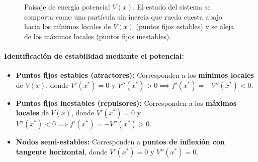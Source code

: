 \begin{figure}[htbp]
\centering
{}
\caption{Paisaje de energía potencial $V(x)$. El estado del sistema se comporta como una partícula sin inercia que rueda cuesta abajo hacia los mínimos locales de $V(x)$ (puntos fijos estables) y se aleja de los máximos locales (puntos fijos inestables).}
\label{fig:paisaje_potencial}
\end{figure}

\paragraph{Identificación de estabilidad mediante el potencial:}
\begin{itemize}
    \item \textbf{Puntos fijos estables (atractores):} Corresponden a los \textbf{mínimos locales} de $V(x)$, donde $V'(x^*) = 0$ y $V''(x^*) > 0 \implies f'(x^*) = -V''(x^*) < 0$.
    \item \textbf{Puntos fijos inestables (repulsores):} Corresponden a los \textbf{máximos locales} de $V(x)$, donde $V'(x^*) = 0$ y $V''(x^*) < 0 \implies f'(x^*) = -V''(x^*) > 0$.
    \item \textbf{Nodos semi-estables:} Corresponden a \textbf{puntos de inflexión con tangente horizontal}, donde $V'(x^*) = 0$ y $V''(x^*) = 0$.
\end{itemize}

